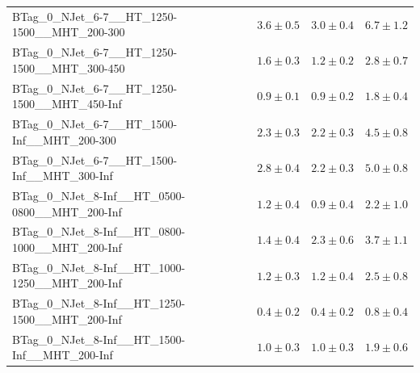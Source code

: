 \documentclass{beamer}
\begin{document}
\begin{frame}
\begin{tabular}{lrrr}
      BTag\_0\_NJet\_6-7\_\_HT\_1250-1500\_\_MHT\_200-300 &               $3.6\pm0.5$&               $3.0\pm0.4$&                   $6.7\pm1.2$ \\ 
      BTag\_0\_NJet\_6-7\_\_HT\_1250-1500\_\_MHT\_300-450 &               $1.6\pm0.3$&               $1.2\pm0.2$&                   $2.8\pm0.7$ \\ 
      BTag\_0\_NJet\_6-7\_\_HT\_1250-1500\_\_MHT\_450-Inf &               $0.9\pm0.1$&               $0.9\pm0.2$&                   $1.8\pm0.4$ \\ 
       BTag\_0\_NJet\_6-7\_\_HT\_1500-Inf\_\_MHT\_200-300 &               $2.3\pm0.3$&               $2.2\pm0.3$&                   $4.5\pm0.8$ \\ 
       BTag\_0\_NJet\_6-7\_\_HT\_1500-Inf\_\_MHT\_300-Inf &               $2.8\pm0.4$&               $2.2\pm0.3$&                   $5.0\pm0.8$ \\ 
    BTag\_0\_NJet\_8-Inf\_\_HT\_0500-0800\_\_MHT\_200-Inf &               $1.2\pm0.4$&               $0.9\pm0.4$&                   $2.2\pm1.0$ \\ 
    BTag\_0\_NJet\_8-Inf\_\_HT\_0800-1000\_\_MHT\_200-Inf &               $1.4\pm0.4$&               $2.3\pm0.6$&                   $3.7\pm1.1$ \\ 
    BTag\_0\_NJet\_8-Inf\_\_HT\_1000-1250\_\_MHT\_200-Inf &               $1.2\pm0.3$&               $1.2\pm0.4$&                   $2.5\pm0.8$ \\ 
    BTag\_0\_NJet\_8-Inf\_\_HT\_1250-1500\_\_MHT\_200-Inf &               $0.4\pm0.2$&               $0.4\pm0.2$&                   $0.8\pm0.4$ \\ 
     BTag\_0\_NJet\_8-Inf\_\_HT\_1500-Inf\_\_MHT\_200-Inf &               $1.0\pm0.3$&               $1.0\pm0.3$&                   $1.9\pm0.6$ \\ 

\bottomrule 
\end{tabular}
\end{frame}
\end{document}
